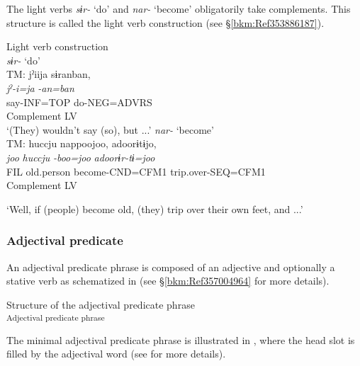 The light verbs \textit{sɨr-} ‘do’ and \textit{nar-} ‘become’ obligatorily take complements. This structure is called the light verb construction (see §\ref{bkm:Ref353886187}).

\ea\label{ex:4.8} Light verb construction\\
\ea \textit{sɨr-} ‘do’\hfill\relax[Co: 111113\_02.txt]\\
TM: \gllll   jˀiija   sɨranban,\\
   {\itshape jˀ-i=ja}   \textit{-an=ban}\\
    say-INF=TOP   do-NEG=ADVRS\\
    Complement   LV\\
\glt{} ‘(They) wouldn’t say (so), but ...’
\ex \textit{nar-} ‘become’\hfill\relax[Co: 120415\_01.txt]\\
TM:    huccju {nappoojoo,}  {adoorɨtɨjo,}\\
   {\itshape joo}  {\itshape huccju}  {\textit{-boo=joo}}  {\itshape adoorɨr-tɨ=joo}\\
   {FIL}   old.person  {become-CND=CFM1}  {trip.over-SEQ=CFM1}\\
      {} Complement LV {}\\
\glt{} \parbox{\linewidth - \widthof{TM: }}{‘Well, if (people) become old, (they) trip over their own feet, and ...’}
\z
\z

\subsubsection{Adjectival predicate}\label{bkm:Ref347240074}\hypertarget{RefHeadingToc395696996}{}
An adjectival predicate phrase is composed of an adjective and optionally a stative verb as schematized in  (see §\ref{bkm:Ref357004964} for more details).

\ea\label{ex:4.9} Structure of the adjectival predicate phrase\\
\textsubscript{Adjectival predicate phrase}\\
\z

\noindent The minimal adjectival predicate phrase is illustrated in , where the head slot is filled by the adjectival word (see  for more details).

